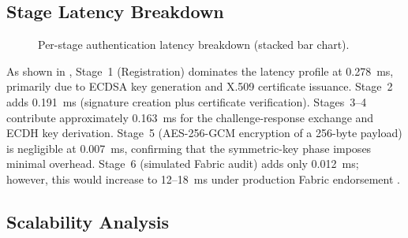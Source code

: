 \documentclass[review,5p,twocolumn,times]{elsarticle}
\begin{document}
\subsection{Stage Latency Breakdown}

\begin{figure}[H]
\centering
{}
\caption{Per-stage authentication latency breakdown (stacked bar chart).}
\label{fig:latency}
\end{figure}

As shown in , Stage~1 (Registration) dominates the
latency profile at 0.278~ms, primarily due to ECDSA key generation and
X.509 certificate issuance. Stage~2 adds 0.191~ms (signature creation
plus certificate verification). Stages~3--4 contribute approximately
0.163~ms for the challenge-response exchange and ECDH key derivation.
Stage~5 (AES-256-GCM encryption of a 256-byte payload) is negligible at
0.007~ms, confirming that the symmetric-key phase imposes minimal
overhead. Stage~6 (simulated Fabric audit) adds only 0.012~ms; however,
this would increase to 12--18~ms under production Fabric endorsement
\cite{androulaki2018hyperledger}.

\subsection{Scalability Analysis}
\end{document}
